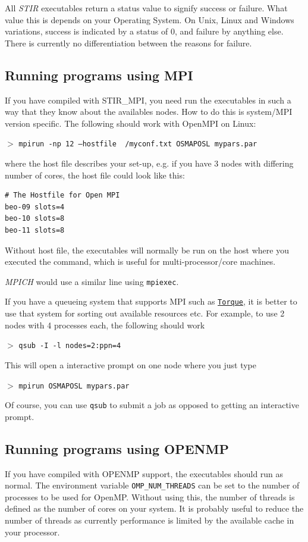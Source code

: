 \documentclass{article}
\def\url#1#2{\mbox{\href{#1}{\tt #2}}}
\newcommand{\cmdline}[1]{\par \noindent $>$ \texttt{#1}\par}
\begin{document}
All \textit{STIR} executables return a status value to signify success 
or failure. What value this is depends on your Operating System. 
On Unix, Linux and Windows variations, success is indicated by 
a status of 0, and failure by anything else. There is currently 
no differentiation between the reasons for failure.

\subsection{
Running programs using MPI \label{sec:RunningWithMPI}}
If you have compiled with STIR\_MPI, you need run the executables in such a way that
they know about the availables nodes. How to do this is system/MPI version specific. The following
should work with OpenMPI on Linux:

\cmdline{mpirun -np 12 --hostfile ~/myconf.txt OSMAPOSL mypars.par}

\noindent 
where the host file describes your set-up, e.g. if you have 3 nodes with differing number of cores, the
host file could look like this:
\begin{verbatim}
# The Hostfile for Open MPI
beo-09 slots=4
beo-10 slots=8
beo-11 slots=8
\end{verbatim}
Without host file, the executables will normally be run on the host where you executed the command, which
is useful for multi-processor/core machines. 

\textit{MPICH} would use a similar line using \texttt{mpiexec}.

If you have a queueing system that supports MPI such as 
\url{http://www.clusterresources.com/products/torque-resource-manager.php}{Torque}, it is better to use 
that system for sorting out available resources etc. For example, to use 2 nodes with 4 processes each,
the following should work

\cmdline{qsub -I -l nodes=2:ppn=4}

This will open a interactive prompt on one node where you just type

\cmdline{mpirun OSMAPOSL mypars.par}

Of course, you can use \texttt{qsub} to submit a job as opposed to getting an interactive prompt.

\subsection{
Running programs using OPENMP \label{sec:RunningWithOPENMP}}
If you have compiled with OPENMP support, the executables should run as normal.
The environment variable \texttt{OMP\_NUM\_THREADS} can be set to the number of processes to be used for OpenMP. 
Without using this, the number of threads is  defined as the number of cores on your system. It is probably 
useful to reduce the number of threads as currently performance is limited by the available cache in your 
processor.
\end{document}
